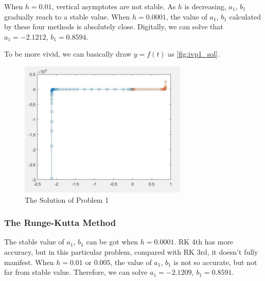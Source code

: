 \documentclass[a4paper]{article}
\begin{document}
	When $h=0.01$, vertical asymptotes are not stable. As $h$ is decreasing, $a_1$, $b_1$ gradually reach to a stable value. When $h=0.0001$, the value of $a_1$, $b_1$ calculated by these four methods is absolutely close. Digitally, we can solve that $a_1=-2.1212$, $b_1=0.8594$.
	
	To be more vivid, we can basically draw $y=f(t)$ as \autoref{fig:ivp1_sol}.
	
	\begin{figure}[H]
		\centering
		\includegraphics[width=8cm]{img/ivp1_sol.png}
		\caption{\label{fig:ivp1_sol} The Solution of Problem 1}
	\end{figure}
	
	
	\subsubsection{The Runge-Kutta Method}
	
	The stable value of $a_1$, $b_1$ can be got when $h=0.0001$. RK 4th has more accuracy, but in this particular problem, compared with RK 3rd, it doesn’t fully manifest. When $h=0.01$ or $0.005$, the value of $a_1$, $b_1$ is not so accurate, but not far from stable value. Therefore, we can solve $a_1=-2.1209$, $b_1= 0.8591$.
	
\end{document}
